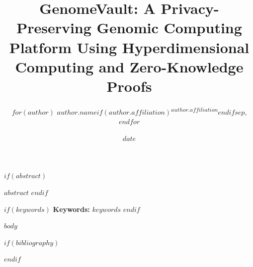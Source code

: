\documentclass[11pt,letterpaper]{article}
\title{\textbf{GenomeVault: A Privacy-Preserving Genomic Computing Platform Using Hyperdimensional Computing and Zero-Knowledge Proofs}}
\author{
$for(author)$
  $author.name$$if(author.affiliation)$\textsuperscript{$author.affiliation$}$endif$$sep$,
$endfor$
}
\date{$date$}
\theoremstyle{definition}
\theoremstyle{remark}
\renewenvironment{abstract}
 {\small
  \begin{center}
  \bfseries \abstractname\vspace{-.5em}\vspace{0pt}
  \end{center}
  \list{}{
    \setlength{\leftmargin}{0.5in}
    \setlength{\rightmargin}{\leftmargin}
  }
  \item\relax}
 {\endlist}
\begin{document}
\maketitle

$if(abstract)$
\begin{abstract}
$abstract$
\end{abstract}
$endif$

$if(keywords)$
\noindent\textbf{Keywords:} $keywords$
$endif$

\tableofcontents
\clearpage

$body$

$if(bibliography)$

$endif$
\end{document}
